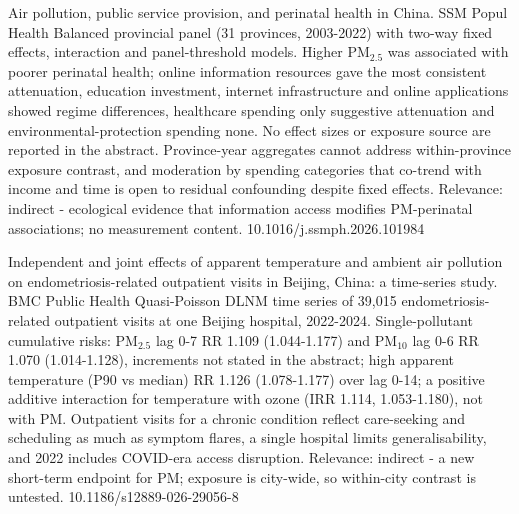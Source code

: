 \documentclass[10pt]{article}
\begin{document}
\par{}\baselineskip{}\baselineskip
{}

{Air pollution, public service provision, and perinatal health in China.}
{SSM Popul Health}
{Balanced provincial panel (31 provinces, 2003-2022) with two-way fixed effects, interaction and panel-threshold models. Higher PM$_{2.5}$ was associated with poorer perinatal health; online information resources gave the most consistent attenuation, education investment, internet infrastructure and online applications showed regime differences, healthcare spending only suggestive attenuation and environmental-protection spending none. No effect sizes or exposure source are reported in the abstract. Province-year aggregates cannot address within-province exposure contrast, and moderation by spending categories that co-trend with income and time is open to residual confounding despite fixed effects. Relevance: indirect - ecological evidence that information access modifies PM-perinatal associations; no measurement content.}
{10.1016/j.ssmph.2026.101984}

{Independent and joint effects of apparent temperature and ambient air pollution on endometriosis-related outpatient visits in Beijing, China: a time-series study.}
{BMC Public Health}
{Quasi-Poisson DLNM time series of 39,015 endometriosis-related outpatient visits at one Beijing hospital, 2022-2024. Single-pollutant cumulative risks: PM$_{2.5}$ lag 0-7 RR 1.109 (1.044-1.177) and PM$_{10}$ lag 0-6 RR 1.070 (1.014-1.128), increments not stated in the abstract; high apparent temperature (P90 vs median) RR 1.126 (1.078-1.177) over lag 0-14; a positive additive interaction for temperature with ozone (IRR 1.114, 1.053-1.180), not with PM. Outpatient visits for a chronic condition reflect care-seeking and scheduling as much as symptom flares, a single hospital limits generalisability, and 2022 includes COVID-era access disruption. Relevance: indirect - a new short-term endpoint for PM; exposure is city-wide, so within-city contrast is untested.}
{10.1186/s12889-026-29056-8}

\par{}\baselineskip{}\baselineskip
{}
\end{document}

